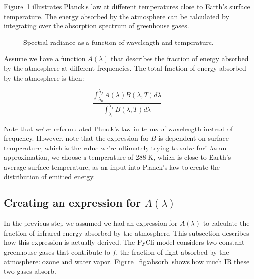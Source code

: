 \documentclass[12pt]{article} %
\begin{document}
Figure~\ref{fig:planck} illustrates Planck's law at different temperatures close to Earth's surface temperature. The energy absorbed by the atmosphere can be calculated by integrating over the absorption spectrum of greenhouse gases. 

\begin{figure}[H]
	\caption{Spectral radiance as a function of wavelength and temperature.}
	\label{fig:planck}
\end{figure}

Assume we have a function $A(\lambda)$ that describes the fraction of energy absorbed by the atmosphere at different frequencies. The total fraction of energy absorbed by the atmosphere is then:

$$\frac{\int_{\lambda_0}^{\lambda_f} A(\lambda) B(\lambda, T) d\lambda}{\int_{\lambda_0}^{\lambda_f} B(\lambda, T) d\lambda }$$

Note that we've reformulated Planck's law in terms of wavelength instead of frequency. However, note that the expression for $B$ is dependent on surface temperature, which is the value we're ultimately trying to solve for! As an approximation, we choose a temperature of 288 K, which is close to Earth's average surface temperature, as an input into Planck's law to create the distribution of emitted energy.

\subsection{Creating an expression for $A(\lambda)$}

In the previous step we assumed we had an expression for $A(\lambda)$ to calculate the fraction of infrared energy absorbed by the atmosphere. This subsection describes how this expression is actually derived. The PyCli model considers two constant greenhouse gases that contribute to $f$, the fraction of light absorbed by the atmosphere: ozone and water vapor.  Figure~\ref{fig:absorb} shows how much IR these two gases absorb.
\end{document}
